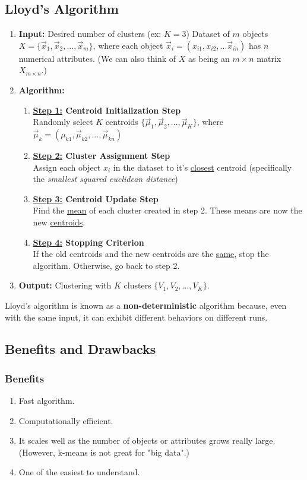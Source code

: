 \documentclass[11pt]{elegantbook}
\begin{document}
\subsection{Lloyd's Algorithm}
\begin{enumerate}
    \item \textbf{Input:}
    \subitem Desired number of clusters (ex: $K=3$)
    \subitem Dataset of $m$ objects $X=\{\vec{x}_1,\vec{x}_2,...,\vec{x}_m\}$, where each object $\vec{x}_i=(x_{i1},x_{i2},...\vec{x}_{in})$ has $n$ numerical attributes. (We can also think of $X$ as being an $m\times n$ matrix $X_{m\times n}$.)
    \item \textbf{Algorithm:}
    \begin{enumerate}[$\bullet$]
        \item \textbf{\underline{Step 1:} Centroid Initialization Step}\\
        Randomly select $K$ centroids $\{\vec{\mu}_1,\vec{\mu}_2,...,\vec{\mu}_K\}$, where $\vec{\mu}_k=(\mu_{k1},\vec{\mu}_{k2},...,\vec{\mu}_{kn})$
        \item \textbf{\underline{Step 2:} Cluster Assignment Step}\\
        Assign each object $x_i$ in the dataset to it's \underline{closest} centroid (specifically the \textit{smallest squared euclidean distance})
        \item \textbf{\underline{Step 3:} Centroid Update Step}\\
        Find the \underline{mean} of each cluster created in step 2. These means are now the new \underline{centroids}.
        \item \textbf{\underline{Step 4:} Stopping Criterion}\\
        If the old centroids and the new centroids are the \underline{same}, stop the algorithm. Otherwise, go back to step 2.
    \end{enumerate}
    \item \textbf{Output:} Clustering with $K$ clusters $\{V_1,V_2,...,V_K\}$.
\end{enumerate}
Lloyd's algorithm is known as a \textbf{non-deterministic} algorithm because,
even with the same input, it can exhibit different behaviors on different runs.

\subsection{Benefits and Drawbacks}
\subsubsection*{Benefits}
\begin{enumerate}[$\bullet$]
    \item Fast algorithm.
    \item Computationally efficient.
    \item It scales well as the number of objects or attributes grows really large. (However, k-means is not great for "big data".)
    \item One of the easiest to understand.
\end{enumerate}
\end{document}
